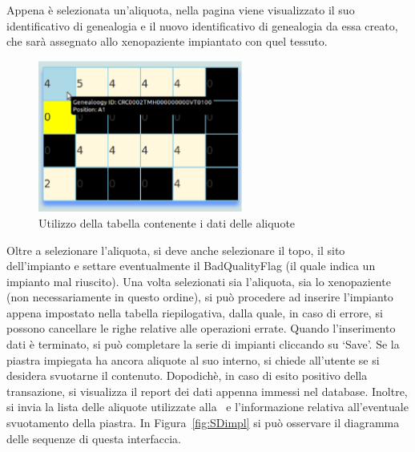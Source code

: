 \noindent Appena \`e selezionata un'aliquota, nella pagina viene visualizzato il suo identificativo di genealogia e il nuovo identificativo di genealogia da essa creato, che sar\`a assegnato allo xenopaziente impiantato con quel tessuto.

\begin{figure}[h]
\begin{center}
\includegraphics[width=0.6\textwidth]{./Figure/implantPlate}
\end{center}
\caption{Utilizzo della tabella contenente i dati delle aliquote\label{fig:implantP}}
\end{figure}

Oltre a selezionare l'aliquota, si deve anche selezionare il topo, il sito dell'impianto e settare eventualmente il BadQualityFlag (il quale indica un impianto mal riuscito). Una volta selezionati sia l'aliquota, sia lo xenopaziente (non necessariamente in questo ordine), si pu\`o procedere ad inserire l'impianto appena impostato nella tabella riepilogativa, dalla quale, in caso di errore, si possono cancellare le righe relative alle operazioni errate. Quando l'inserimento dati \`e terminato, si pu\`o completare la serie di impianti cliccando su `Save'. Se la piastra impiegata ha ancora aliquote al suo interno, si chiede all'utente se si desidera svuotarne il contenuto. Dopodich\`e, in caso di esito positivo della transazione, si visualizza il report dei dati appenna immessi nel database. Inoltre, si invia la lista delle aliquote utilizzate alla \Tissue\ e l'informazione relativa all'eventuale svuotamento della piastra. In Figura~\ref{fig:SDimpl} si pu\`o osservare il diagramma delle sequenze di questa interfaccia.

